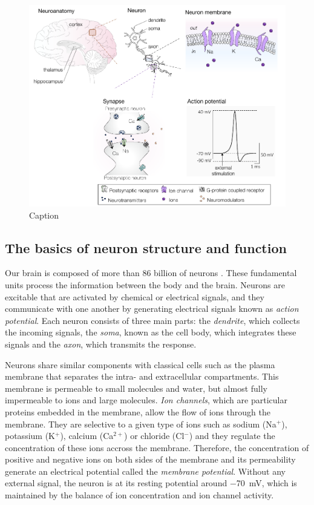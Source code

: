 \begin{figure}[h!]
    \centering
    \includegraphics{latex/fig/Intro/Bgd_scale.pdf}
    \caption{Caption}
    \label{fig:Bgd_scale}
\end{figure}

\subsection{The basics of neuron structure and function}
Our brain is composed of more than 86 billion of neurons \citep{Herculano-Houzel_human_2009}. These fundamental units process the information between the body and the brain. Neurons are excitable that are activated by chemical or electrical signals, and they communicate with one another by generating electrical signals known as \textit{action potential}. Each neuron consists of three main parts: the \textit{dendrite}, which collects the incoming signals, the \textit{soma}, known as the cell body, which integrates these signals and the \textit{axon}, which transmits the response. 

Neurons share similar components with classical cells such as the plasma membrane that separates the intra- and extracellular compartments. This membrane is permeable to small molecules and water, but almost fully impermeable to ions and large molecules. \textit{Ion channels}, which are particular proteins embedded in the membrane, allow the flow of ions through the membrane. They are selective to a given type of ions such as sodium (Na$^+$), potassium (K$^+$), calcium (Ca$^{2+}$) or chloride (Cl$^-$) and they regulate the concentration of these ions accross the membrane. Therefore, the concentration of positive and negative ions on both sides of the membrane and its permeability generate an electrical potential called the \textit{membrane potential}. Without any external signal, the neuron is at its resting potential around \SI{-70}{mV}, which is maintained by the balance of ion concentration and ion channel activity. 

